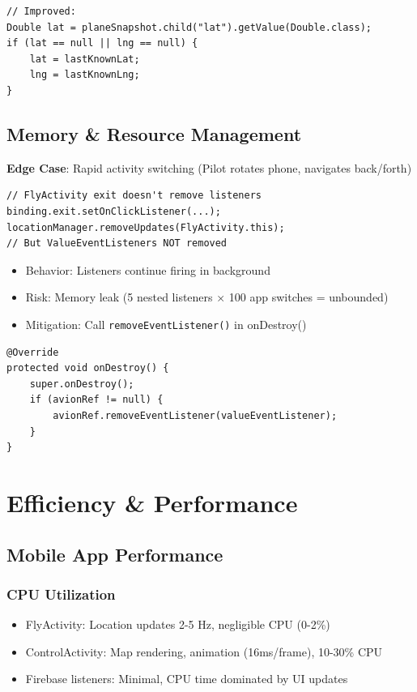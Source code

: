 \documentclass[11pt,a4paper]{report}
\begin{document}
\begin{lstlisting}
// Improved:
Double lat = planeSnapshot.child("lat").getValue(Double.class);
if (lat == null || lng == null) {
    lat = lastKnownLat;
    lng = lastKnownLng;
}
\end{lstlisting}

\section{Memory \& Resource Management}

\textbf{Edge Case}: Rapid activity switching (Pilot rotates phone, navigates back/forth)

\begin{lstlisting}
// FlyActivity exit doesn't remove listeners
binding.exit.setOnClickListener(...);
locationManager.removeUpdates(FlyActivity.this);
// But ValueEventListeners NOT removed
\end{lstlisting}

\begin{itemize}
    \item Behavior: Listeners continue firing in background
    \item Risk: Memory leak (5 nested listeners × 100 app switches = unbounded)
    \item Mitigation: Call \texttt{removeEventListener()} in onDestroy()
\end{itemize}

\begin{lstlisting}
@Override
protected void onDestroy() {
    super.onDestroy();
    if (avionRef != null) {
        avionRef.removeEventListener(valueEventListener);
    }
}
\end{lstlisting}

\chapter{Efficiency \& Performance}

\section{Mobile App Performance}

\subsection{CPU Utilization}

\begin{itemize}
    \item FlyActivity: Location updates 2-5 Hz, negligible CPU (0-2\%)
    \item ControlActivity: Map rendering, animation (16ms/frame), 10-30\% CPU
    \item Firebase listeners: Minimal, CPU time dominated by UI updates
\end{itemize}
\end{document}
